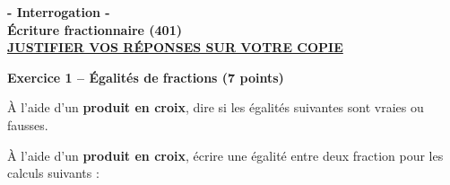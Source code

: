 \documentclass[12pt,a4paper]{exam}
\begin{document}
\begin{center}
\Large \textbf{- Interrogation -\\Écriture fractionnaire (401)}
\vspace{0.5cm}
\\\large \underline{\textbf{JUSTIFIER VOS RÉPONSES SUR VOTRE COPIE}}
\end{center}
\vspace{0.4cm}
\noindent\hrulefill
\vspace{0.5cm}


\textbf{Exercice 1 – Égalités de fractions (7 points)}
\vspace{5pt}

\begin{questions}
    \question[2] À l’aide d’un \textbf{produit en croix}, dire si les égalités suivantes
    sont vraies ou fausses.
    \vspace{5pt}

    \vspace{10pt}

    \question[2] À l’aide d’un \textbf{produit en croix}, écrire une égalité entre deux fraction
    pour les calculs suivants :
    \vspace{5pt}

    \vspace{10pt}


\end{questions}
\end{document}
